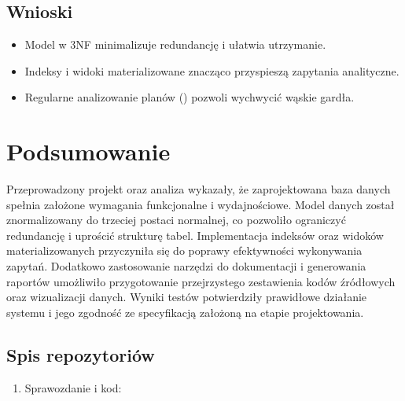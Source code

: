 \documentclass[a4paper,11pt,openany,english]{sphinxmanual}
\begin{document}
\section{Wnioski}
\label{\detokenize{rozdzial4/index:wnioski}}\begin{itemize}
\item {} 
\sphinxAtStartPar
Model w 3NF minimalizuje redundancję i ułatwia utrzymanie.

\item {} 
\sphinxAtStartPar
Indeksy i widoki materializowane znacząco przyspieszą zapytania analityczne.

\item {} 
\sphinxAtStartPar
Regularne analizowanie planów () pozwoli wychwycić wąskie gardła.

\end{itemize}

\sphinxstepscope


\chapter{Podsumowanie}
\label{\detokenize{rozdzial5/index:podsumowanie}}\label{\detokenize{rozdzial5/index::doc}}
\sphinxAtStartPar
Przeprowadzony projekt oraz analiza wykazały, że zaprojektowana baza danych spełnia założone wymagania funkcjonalne i wydajnościowe. Model danych został znormalizowany do trzeciej postaci normalnej, co pozwoliło ograniczyć redundancję i uprościć strukturę tabel. Implementacja indeksów oraz widoków materializowanych przyczyniła się do poprawy efektywności wykonywania zapytań. Dodatkowo zastosowanie narzędzi do dokumentacji i generowania raportów umożliwiło przygotowanie przejrzystego zestawienia kodów źródłowych oraz wizualizacji danych. Wyniki testów potwierdziły prawidłowe działanie systemu i jego zgodność ze specyfikacją założoną na etapie projektowania.


\section{Spis repozytoriów}
\label{\detokenize{rozdzial5/index:spis-repozytoriow}}\begin{enumerate}
%
\item {} 
\sphinxAtStartPar
Sprawozdanie i kod: 

\end{enumerate}
\end{document}
